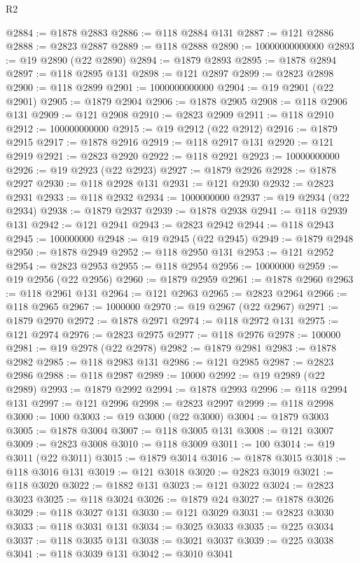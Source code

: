 \begin{lexlean}{R2}
\begin{coremodule}
@2884 := @1878 @2883
@2886 := @118 @2884 @131
@2887 := @121 @2886
@2888 := @2823 @2887
@2889 := @118 @2888
@2890 := 10000000000000
@2893 := @19 @2890 (@22 @2890)
@2894 := @1879 @2893
@2895 := @1878 @2894
@2897 := @118 @2895 @131
@2898 := @121 @2897
@2899 := @2823 @2898
@2900 := @118 @2899
@2901 := 1000000000000
@2904 := @19 @2901 (@22 @2901)
@2905 := @1879 @2904
@2906 := @1878 @2905
@2908 := @118 @2906 @131
@2909 := @121 @2908
@2910 := @2823 @2909
@2911 := @118 @2910
@2912 := 100000000000
@2915 := @19 @2912 (@22 @2912)
@2916 := @1879 @2915
@2917 := @1878 @2916
@2919 := @118 @2917 @131
@2920 := @121 @2919
@2921 := @2823 @2920
@2922 := @118 @2921
@2923 := 10000000000
@2926 := @19 @2923 (@22 @2923)
@2927 := @1879 @2926
@2928 := @1878 @2927
@2930 := @118 @2928 @131
@2931 := @121 @2930
@2932 := @2823 @2931
@2933 := @118 @2932
@2934 := 1000000000
@2937 := @19 @2934 (@22 @2934)
@2938 := @1879 @2937
@2939 := @1878 @2938
@2941 := @118 @2939 @131
@2942 := @121 @2941
@2943 := @2823 @2942
@2944 := @118 @2943
@2945 := 100000000
@2948 := @19 @2945 (@22 @2945)
@2949 := @1879 @2948
@2950 := @1878 @2949
@2952 := @118 @2950 @131
@2953 := @121 @2952
@2954 := @2823 @2953
@2955 := @118 @2954
@2956 := 10000000
@2959 := @19 @2956 (@22 @2956)
@2960 := @1879 @2959
@2961 := @1878 @2960
@2963 := @118 @2961 @131
@2964 := @121 @2963
@2965 := @2823 @2964
@2966 := @118 @2965
@2967 := 1000000
@2970 := @19 @2967 (@22 @2967)
@2971 := @1879 @2970
@2972 := @1878 @2971
@2974 := @118 @2972 @131
@2975 := @121 @2974
@2976 := @2823 @2975
@2977 := @118 @2976
@2978 := 100000
@2981 := @19 @2978 (@22 @2978)
@2982 := @1879 @2981
@2983 := @1878 @2982
@2985 := @118 @2983 @131
@2986 := @121 @2985
@2987 := @2823 @2986
@2988 := @118 @2987
@2989 := 10000
@2992 := @19 @2989 (@22 @2989)
@2993 := @1879 @2992
@2994 := @1878 @2993
@2996 := @118 @2994 @131
@2997 := @121 @2996
@2998 := @2823 @2997
@2999 := @118 @2998
@3000 := 1000
@3003 := @19 @3000 (@22 @3000)
@3004 := @1879 @3003
@3005 := @1878 @3004
@3007 := @118 @3005 @131
@3008 := @121 @3007
@3009 := @2823 @3008
@3010 := @118 @3009
@3011 := 100
@3014 := @19 @3011 (@22 @3011)
@3015 := @1879 @3014
@3016 := @1878 @3015
@3018 := @118 @3016 @131
@3019 := @121 @3018
@3020 := @2823 @3019
@3021 := @118 @3020
@3022 := @1882 @131
@3023 := @121 @3022
@3024 := @2823 @3023
@3025 := @118 @3024
@3026 := @1879 @24
@3027 := @1878 @3026
@3029 := @118 @3027 @131
@3030 := @121 @3029
@3031 := @2823 @3030
@3033 := @118 @3031 @131
@3034 := @3025 @3033
@3035 := @225 @3034
@3037 := @118 @3035 @131
@3038 := @3021 @3037
@3039 := @225 @3038
@3041 := @118 @3039 @131
@3042 := @3010 @3041

\end{coremodule}
\end{lexlean}
